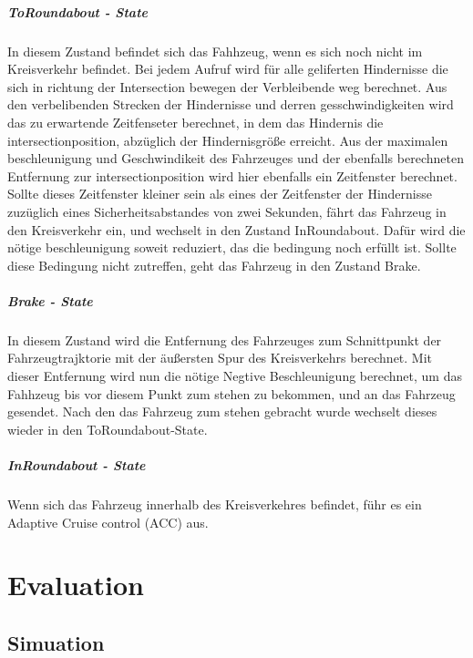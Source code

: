 \documentclass[11pt,oneside,openright]{mpreport}
\begin{document}
\paragraph{ToRoundabout - State}
In diesem Zustand befindet sich das Fahhzeug, wenn es sich noch nicht im Kreisverkehr befindet. Bei jedem Aufruf wird für alle geliferten
Hindernisse die sich in richtung der Intersection bewegen der Verbleibende weg berechnet.  Aus den verbelibenden Strecken der Hindernisse und 
derren gesschwindigkeiten wird das zu erwartende Zeitfenseter berechnet, in dem das Hindernis die intersectionposition, abzüglich der Hindernisgröße erreicht. 
Aus der maximalen beschleunigung und Geschwindikeit  des Fahrzeuges und der ebenfalls berechneten Entfernung zur intersectionposition wird hier
ebenfalls ein Zeitfenster berechnet. Sollte dieses Zeitfenster kleiner sein als eines der Zeitfenster der Hindernisse zuzüglich eines Sicherheitsabstandes von zwei Sekunden, 
fährt das Fahrzeug in den Kreisverkehr ein, und wechselt in den Zustand InRoundabout. Dafür wird die nötige beschleunigung soweit reduziert,
das die bedingung noch erfüllt ist. Sollte diese Bedingung nicht zutreffen, geht das Fahrzeug in den Zustand Brake.

\paragraph{Brake - State}
In diesem Zustand wird die Entfernung des Fahrzeuges zum Schnittpunkt der Fahrzeugtrajktorie mit der äußersten Spur des Kreisverkehrs berechnet.
Mit dieser Entfernung wird nun die nötige Negtive Beschleunigung berechnet, um das Fahhzeug bis vor diesem Punkt zum stehen zu bekommen, und an das Fahrzeug gesendet.
Nach den das Fahrzeug zum stehen gebracht wurde wechselt dieses wieder in den ToRoundabout-State.


\paragraph{InRoundabout - State}
Wenn sich das Fahrzeug innerhalb des Kreisverkehres befindet, führ es ein Adaptive Cruise control (ACC) aus. 


\chapter{Evaluation}



\section{Simuation}
\end{document}
